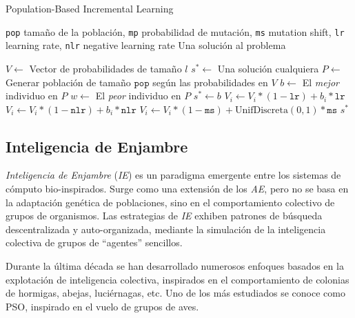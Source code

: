 \begin{algorithm}
\caption{Population-Based Incremental Learning}
\label{pbil-alg}
\begin{algorithmic}[1]

\Require \texttt{pop} tamaño de la población,
	\texttt{mp} probabilidad de mutación,
	\texttt{ms} mutation shift,
	\texttt{lr} learning rate,
	\texttt{nlr} negative learning rate
\Ensure Una solución al problema

\State $V \gets$ Vector de probabilidades de tamaño $l$
\State $s^* \gets$ Una solución cualquiera
	\State $P \gets$ Generar población de tamaño $\texttt{pop}$ según las probabilidades en $V$
	\State $b \gets $ El \emph{mejor} individuo en $P$
	\State $w \gets $ El \emph{peor} individuo en $P$
		\State $s^* \gets b$
	\EndIf
	 
		\State $V_i \gets V_i * (1 - \texttt{lr}) + b_i * \texttt{lr}$
			\State $V_i \gets V_i * (1 - \texttt{nlr}) + b_i * \texttt{nlr}$
		\EndIf
		 
			\State $V_i \gets V_i * (1 - \texttt{ms}) + \mathrm{UnifDiscreta}(0,1) * \texttt{ms}$
		\EndIf
	\EndFor
\EndWhile
\State \Return $s^*$

\end{algorithmic}
\end{algorithm}

\subsection{Inteligencia de Enjambre}

\emph{Inteligencia de Enjambre} \cite{Bonabeau:1999:SIN:328320} (\emph{IE}) es un paradigma emergente entre los sistemas de cómputo bio-inspirados. Surge como una extensión de los \emph{AE}, pero no se basa en la adaptación genética de poblaciones, sino en el comportamiento colectivo de grupos de organismos. Las estrategias de \emph{IE} exhiben patrones de búsqueda descentralizada y auto-organizada, mediante la simulación de la inteligencia colectiva de grupos de ``agentes'' sencillos.

Durante la última década se han desarrollado numerosos enfoques basados en la explotación de inteligencia colectiva, inspirados en el comportamiento de colonias de hormigas, abejas, luciérnagas, etc. Uno de los más estudiados se conoce como PSO, inspirado en el vuelo de grupos de aves.

